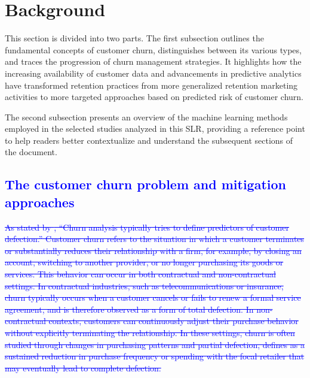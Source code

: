 \section{Background}
\label{sec:background}



This section is divided into two parts. The first subsection outlines the fundamental concepts of customer churn, distinguishes between its various types, and traces the progression of churn management strategies. It highlights how the increasing availability of customer data and advancements in predictive analytics have transformed retention practices from more generalized retention marketing activities to more targeted approaches based on predicted risk of customer churn.

The second subsection presents an overview of the machine learning methods employed in the selected studies analyzed in this SLR, providing a reference point to help readers better contextualize and understand the subsequent sections of the document.
 
\subsection{\textcolor{blue}{The customer churn problem and mitigation approaches}}

\textcolor{blue}{\sout{As stated by \cite{S37-ID826-Buckinx}, ``Churn analysis typically tries to define predictors of customer defection.'' Customer churn refers to the situation in which a customer terminates or substantially reduces their relationship with a firm, for example, by closing an account, switching to another provider, or no longer purchasing its goods or services. This behavior can occur in both contractual and non-contractual settings. In contractual industries, such as telecommunications or insurance, churn typically occurs when a customer cancels or fails to renew a formal service agreement, and is therefore observed as a form of total defection. In non-contractual contexts, customers can continuously adjust their purchase behavior without explicitly terminating the relationship. In these settings, churn is often studied through changes in purchasing patterns and partial defection, defines as a sustained reduction in purchase frequency or spending with the focal retailer that may eventually lead to complete defection.}} 

